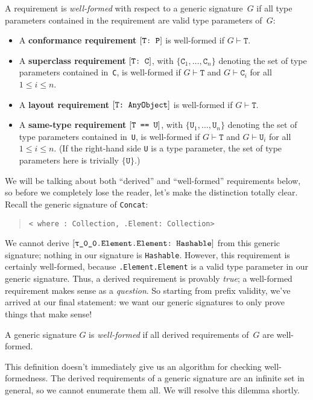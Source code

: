 \documentclass[../generics]{subfiles}
\begin{document}
\begin{definition}\label{valid requirement}
A requirement is \emph{well-formed} with respect to a generic signature~$G$ if all type parameters contained in the requirement are valid type parameters of~$G$:
\begin{itemize}
\item A \textbf{conformance requirement} $[\texttt{T:~P}]$ is well-formed if $G\vdash\texttt{T}$.
\item A \textbf{superclass requirement} $[\texttt{T:~C}]$, with $\{\texttt{C}_1,\ldots,\texttt{C}_n\}$ denoting the set of type parameters contained in~\texttt{C}, is well-formed if $G\vdash\texttt{T}$ and $G\vdash\texttt{C}_i$ for all $1\le i\le n$.
\item A \textbf{layout requirement} $[\texttt{T:~AnyObject}]$ is well-formed if $G\vdash\texttt{T}$.
\item A \textbf{same-type requirement} $[\texttt{T == U}]$, with $\{\texttt{U}_1,\ldots,\texttt{U}_n\}$ denoting the set of type parameters contained in~\texttt{U}, is well-formed if $G\vdash\texttt{T}$ and $G\vdash\texttt{U}_i$ for all $1\le i\le n$. (If the right-hand side \texttt{U} is a type parameter, the set of type parameters here is trivially $\{\texttt{U}\}$.)
\end{itemize}
\end{definition}

We will be talking about both ``derived'' and ``well-formed'' requirements below, so before we completely lose the reader, let's make the distinction totally clear. Recall the generic signature of \texttt{Concat}:
\begin{quote}
\texttt{<\rT~where \rT:~Collection, \rT.Element:~Collection>}
\end{quote}
We cannot derive $[\texttt{\texttt{$\uptau$\_0\_0}.Element.Element:~Hashable}]$ from this generic signature; nothing in our signature is \texttt{Hashable}. However, this requirement is certainly well-formed, because \texttt{\rT.Element.Element} is a valid type parameter in our generic signature. Thus, a derived requirement is provably \emph{true}; a well-formed requirement makes sense as a \emph{question}. So starting from prefix validity, we've arrived at our final statement: we want our generic signatures to only prove things that make sense!

\begin{definition}\label{valid generic signature def}
A generic signature $G$ is \emph{well-formed} if all derived requirements of~$G$ are well-formed.
\end{definition}
This definition doesn't immediately give us an algorithm for checking well-formedness. The derived requirements of a generic signature are an infinite set in general, so we cannot enumerate them all. We will resolve this dilemma shortly.
\end{document}
